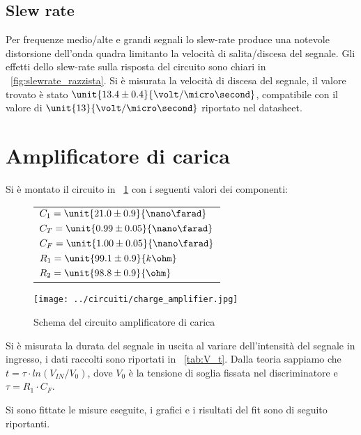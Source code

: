 \documentclass[10pt,a4paper]{article}
\begin{document}
\subsection{Slew rate}
Per frequenze medio/alte e grandi segnali lo slew-rate produce una notevole distorsione dell'onda quadra limitanto la velocità di salita/discesa del segnale. Gli effetti dello slew-rate sulla risposta del circuito sono chiari in \figurename{~\ref{fig:slewrate_razzista}}. Si è misurata la velocità di discesa del segnale, il valore trovato è stato $\unit{13.4 \pm 0.4}{\volt /\micro\second}$, compatibile con il valore di $\unit{13}{\volt / \micro\second}$ riportato nel datasheet.

\section{Amplificatore di carica}

Si è montato il circuito in \figurename{~\ref{circuio_ampli}} con i seguenti valori dei componenti:

\begin{figure}[H]
	\begin{minipage}{0.3\textwidth}
		\centering
		\begin{tabular}{l}
			$C_1 = \unit{21.0 \pm 0.9}{\nano\farad}$  \\ 
			$C_T = \unit{0.99 \pm 0.05}{\nano\farad}$ \\
			$C_F = \unit{1.00 \pm 0.05}{\nano\farad}$ \\
			$R_1 = \unit{99.1 \pm 0.9}{k\ohm}$  \\
			$R_2 = \unit{98.8 \pm 0.9}{\ohm}$
		\end{tabular}
	\end{minipage}
	\begin{minipage}{0.7\textwidth}
		\centering
		\texttt{[image: ../circuiti/charge\_amplifier.jpg]}
		\caption{Schema del circuito amplificatore di carica}
		\label{circuio_ampli}
	\end{minipage}
\end{figure}

Si è misurata la durata del segnale in uscita al variare dell'intensità del segnale in ingresso, i dati raccolti sono riportati in \tablename{~\ref{tab:V_t}}.
Dalla teoria sappiamo che $t = \tau \cdot ln(V_{IN}/V_0)$, dove $V_0$ è la tensione di soglia fissata nel discriminatore e $\tau = R_1 \cdot C_F$.

Si sono fittate le misure eseguite, i grafici e i risultati del fit sono di seguito riportanti.
\end{document}
